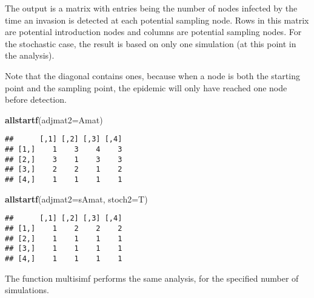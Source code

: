 \documentclass[]{article}
\newenvironment{Shaded}{\begin{snugshade}}{\end{snugshade}}
\newcommand{\KeywordTok}[1]{\textcolor[rgb]{0.13,0.29,0.53}{\textbf{#1}}}
\newcommand{\DataTypeTok}[1]{\textcolor[rgb]{0.13,0.29,0.53}{#1}}
\newcommand{\NormalTok}[1]{#1}
\begin{document}
The output is a matrix with entries being the number of nodes infected
by the time an invasion is detected at each potential sampling node.
Rows in this matrix are potential introduction nodes and columns are
potential sampling nodes. For the stochastic case, the result is based
on only one simulation (at this point in the analysis).

Note that the diagonal contains ones, because when a node is both the
starting point and the sampling point, the epidemic will only have
reached one node before detection.

\begin{Shaded}
\begin{Highlighting}[]
\KeywordTok{allstartf}\NormalTok{(}\DataTypeTok{adjmat2=}\NormalTok{Amat)}
\end{Highlighting}
\end{Shaded}

\begin{verbatim}
##      [,1] [,2] [,3] [,4]
## [1,]    1    3    4    3
## [2,]    3    1    3    3
## [3,]    2    2    1    2
## [4,]    1    1    1    1
\end{verbatim}

\begin{Shaded}
\begin{Highlighting}[]
\KeywordTok{allstartf}\NormalTok{(}\DataTypeTok{adjmat2=}\NormalTok{sAmat, }\DataTypeTok{stoch2=}\NormalTok{T)}
\end{Highlighting}
\end{Shaded}

\begin{verbatim}
##      [,1] [,2] [,3] [,4]
## [1,]    1    2    2    2
## [2,]    1    1    1    1
## [3,]    1    1    1    1
## [4,]    1    1    1    1
\end{verbatim}

The function multisimf performs the same analysis, for the specified
number of simulations.
\end{document}
